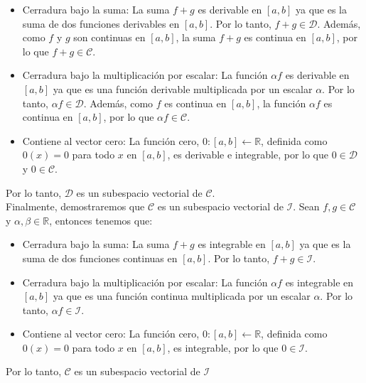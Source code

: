 \begin{itemize}
    \item Cerradura bajo la suma: La suma $f + g$ es derivable en $[a, b]$ ya que es la suma de dos funciones derivables en $[a, b]$. Por lo tanto, $f + g \in \mathcal{D}$. Además, como $f$ y $g$ son continuas en $[a, b]$, la suma $f + g$ es continua en $[a, b]$, por lo que $f + g \in \mathcal{C}$.
    \item Cerradura bajo la multiplicación por escalar: La función $\alpha f$ es derivable en $[a, b]$ ya que es una función derivable multiplicada por un escalar $\alpha$. Por lo tanto, $\alpha f  \in \mathcal{D}$. Además, como $f$ es continua en $[a, b]$, la función $\alpha f$ es continua en $[a, b]$, por lo que $\alpha f \in \mathcal{C}$.
    \item Contiene al vector cero: La función cero, $0: [a, b] \leftarrow \mathbb{R}$, definida como $0(x) = 0$ para todo $x$ en $[a, b]$, es derivable e integrable, por lo que $0 \in \mathcal{D}$ y $0 \in \mathcal{C}$.
\end{itemize}

Por lo tanto, $\mathcal{D}$ es un subespacio vectorial de $\mathcal{C}$.\\

Finalmente, demostraremos que $\mathcal{C}$ es un subespacio vectorial de $\mathcal{I}$. Sean $f, g \in \mathcal{C}$ y $\alpha, \beta \in \mathbb{R}$, entonces tenemos que:\\

\begin{itemize}
    \item Cerradura bajo la suma: La suma $f + g$ es integrable en $[a, b]$ ya que es la suma de dos funciones continuas en $[a, b]$. Por lo tanto, $f + g \in \mathcal{I}$.
    \item Cerradura bajo la multiplicación por escalar: La función $\alpha f$ es integrable en $[a, b]$ ya que es una función continua multiplicada por un escalar $\alpha$. Por lo tanto, $\alpha f \in \mathcal{I}$.
    \item Contiene al vector cero: La función cero, $0: [a, b] \leftarrow \mathbb{R}$, definida como $0(x) = 0$ para todo $x$ en $[a, b]$, es integrable, por lo que $0 \in \mathcal{I}$.
\end{itemize}

Por lo tanto, $\mathcal{C}$ es un subespacio vectorial de $\mathcal{I}$
